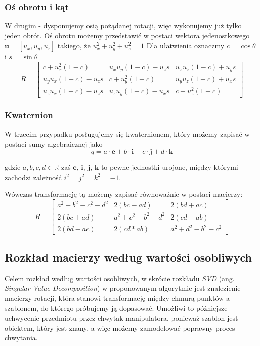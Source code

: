 \documentclass[12pt]{article}
\begin{document}
\subsubsection{Oś obrotu i kąt}
W drugim - dysponujemy osią pożądanej rotacji, więc wykonujemy już tylko jeden obrót. Oś obrotu możemy przedstawić w postaci wektora jedenostkowego $\textbf{u} = [u_{x}, u_{y}, u_{z}]$ takiego, że $u_{x}^2+u_{y}^2+u_{z}^2 = 1$ 
Dla ułatwienia oznaczmy $c = \cos \theta$ i $s = \sin \theta$
\[
R = \begin{bmatrix}
c+u_{x}^2(1-c) & u_{x}u_{y}(1-c)-u_{z}s & u_{x}u_{z}(1-c)+u_{y}s \\
u_{y}u_{x}(1-c)-u_{z}s & c+u_{y}^2(1-c) & u_{y}u_{z}(1-c)+u_{x}s \\
u_{z}u_{x}(1-c)-u_{z}s & u_{z}u_{y}(1-c)-u_{x}s & c+u_{z}^2(1-c)
\end{bmatrix}
\]

\subsubsection{Kwaternion}
W trzecim przypadku posługujemy się kwaternionem, który możemy zapisać w postaci sumy algebraicznej jako
\[q = a \cdot \textbf{e} + b \cdot \textbf{i} + c \cdot \textbf{j} + d \cdot \textbf{k} \]

gdzie $a, b, c, d \in \mathbb{R}$ zaś $\textbf{e, i, j, k}$ to pewne jednostki urojone, między którymi zachodzi zależność $i^2 = j^2 = k^2 = -1$.

Wówczas transformację tą możemy zapisać równoważnie w postaci macierzy:
\[
R = \begin{bmatrix}
a^2+b^2-c^2-d^2 & 2(bc-ad) & 2(bd+ac) \\
2(bc+ad) & a^2+c^2-b^2-d^2 & 2(cd-ab) \\
2(bd-ac) & 2(cd*ab) & a^2+d^2-b^2-c^2
\end{bmatrix}
\]

\newpage
\subsection{Rozkład macierzy według wartości osobliwych}
Celem rozkład według wartości osobliwych, w skrócie rozkładu \emph{SVD} (ang. \emph{Singular Value Decomposition}) w proponowanym algorytmie jest znalezienie macierzy rotacji, która stanowi transformację między chmurą punktów a szablonem, do którego próbujemy ją dopasować. Umożliwi to późniejsze uchwycenie przedmiotu przez chwytak manipulatora, ponieważ szablon jest obiektem, który jest znany, a więc możemy zamodelować poprawny proces chwytania.
\end{document}
